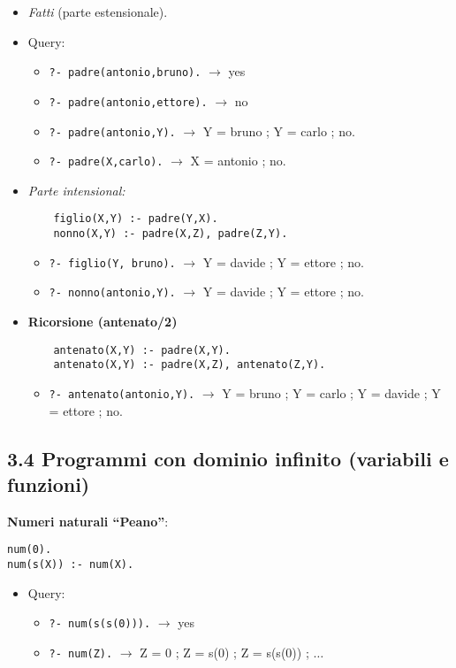 \documentclass[12pt]{article}
\begin{document}
\begin{itemize}
  \item \emph{Fatti} (parte estensionale).
  \item Query:
    \begin{itemize}
      \item \texttt{?- padre(antonio,bruno).} $\to$ yes
      \item \texttt{?- padre(antonio,ettore).} $\to$ no
      \item \texttt{?- padre(antonio,Y).} $\to$ Y = bruno ; Y = carlo ; no.
      \item \texttt{?- padre(X,carlo).} $\to$ X = antonio ; no.
    \end{itemize}

  \item \emph{Parte intensional:}
    \begin{verbatim}
    figlio(X,Y) :- padre(Y,X).
    nonno(X,Y) :- padre(X,Z), padre(Z,Y).
    \end{verbatim}
    \begin{itemize}
      \item \texttt{?- figlio(Y, bruno).} $\to$ Y = davide ; Y = ettore ; no.
      \item \texttt{?- nonno(antonio,Y).} $\to$ Y = davide ; Y = ettore ; no.
    \end{itemize}

  \item \textbf{Ricorsione (antenato/2)}
    \begin{verbatim}
    antenato(X,Y) :- padre(X,Y).
    antenato(X,Y) :- padre(X,Z), antenato(Z,Y).
    \end{verbatim}
    \begin{itemize}
      \item \texttt{?- antenato(antonio,Y).} $\to$ Y = bruno ; Y = carlo ; Y = davide ; Y = ettore ; no.
    \end{itemize}
\end{itemize}

\subsection*{3.4 Programmi con dominio infinito (variabili e funzioni)}

\textbf{Numeri naturali “Peano”}:
\begin{verbatim}
num(0).
num(s(X)) :- num(X).
\end{verbatim}
\begin{itemize}
  \item Query:
    \begin{itemize}
      \item \texttt{?- num(s(s(0))).} $\to$ yes
      \item \texttt{?- num(Z).} $\to$ Z = 0 ; Z = s(0) ; Z = s(s(0)) ; $\dots$
    \end{itemize}
\end{itemize}
\end{document}
